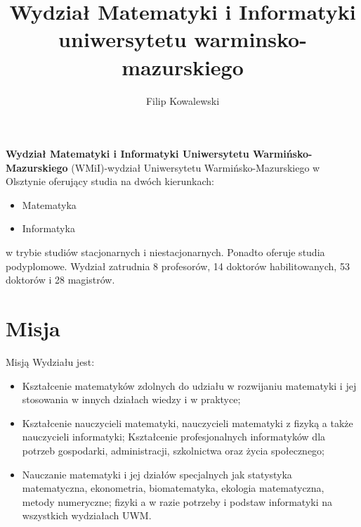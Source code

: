 \documentclass[a4paper,12pt]{article}
\begin{document}
\title{Wydział Matematyki i Informatyki uniwersytetu warminsko-mazurskiego}
\author{Filip Kowalewski}
\date{}
\maketitle



\textbf{Wydział Matematyki i Informatyki Uniwersytetu Warmińsko-Mazurskiego} 
(WMiI)-wydział Uniwersytetu Warmińsko-Mazurskiego w Olsztynie oferujący studia na dwóch kierunkach:
\begin{itemize}
\item Matematyka
\item Informatyka
\end{itemize}
w trybie studiów stacjonarnych i niestacjonarnych. Ponadto oferuje studia podyplomowe.
Wydział zatrudnia 8 profesorów, 14 doktorów habilitowanych, 53 doktorów i 28 magistrów.

\tableofcontents 


\section{Misja} 
Misją Wydziału jest:
\begin{itemize}
\item{Kształcenie matematyków zdolnych do udziału w rozwijaniu matematyki i jej stosowania w innych
działach wiedzy i w praktyce;}
\item{Kształcenie nauczycieli matematyki, nauczycieli matematyki z fizyką a także nauczycieli informatyki;
Kształcenie profesjonalnych informatyków dla potrzeb gospodarki, administracji, szkolnictwa oraz życia
społecznego;}
\item{Nauczanie matematyki i jej działów specjalnych jak statystyka matematyczna, ekonometria,
biomatematyka, ekologia matematyczna, metody numeryczne; fizyki a w razie potrzeby i podstaw
informatyki na wszystkich wydziałach UWM.}
\end{itemize}
\end{document}
